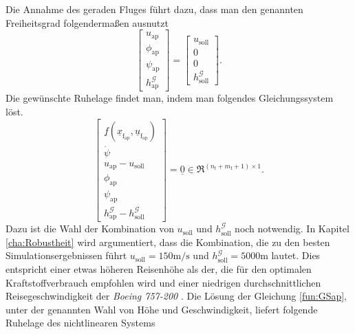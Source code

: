 Die Annahme des geraden Fluges führt dazu, dass man den genannten Freiheitsgrad folgenderma{\ss}en ausnutzt
\begin{equation}
\begin{bmatrix} 
u_\mathrm{ap} \\
\phi_\mathrm{ap} \\
\psi_\mathrm{ap}\\
h^\mathcal{G}_\mathrm{ap}
\end{bmatrix} = \begin{bmatrix} 
u_\mathrm{soll} \\
0 \\
0\\
h^\mathcal{G}_\mathrm{soll}
\end{bmatrix}.
\end{equation} 
Die gewünschte Ruhelage findet man, indem man folgendes Gleichungssystem löst.
\begin{equation}
\label{fun:GSap}
\begin{bmatrix} 
\underline{f}(\underline{x}_\mathrm{f_{ap}},\underline{u}_\mathrm{f_{ap}}) \\
\dot{\psi} \\
u_\mathrm{ap} - u_\mathrm{soll}\\
\phi_\mathrm{ap}\\
\psi_\mathrm{ap}\\
h^\mathcal{G}_\mathrm{ap} -h^\mathcal{G}_\mathrm{soll}
\end{bmatrix} = \underline{0} \in \Re^{(n_\mathrm{f}+m_\mathrm{f}+1)\times 1}.
\end{equation}
Dazu ist die Wahl der Kombination von $u_\mathrm{soll}$ und $h^\mathcal{G}_\mathrm{soll}$ noch notwendig. In Kapitel \ref{cha:Robustheit} wird argumentiert, dass die Kombination, die zu den besten Simulationsergebnissen führt $u_\mathrm{soll} = 150 \mathrm{m/s}$ und  $h^\mathcal{G}_\mathrm{soll} = 5000 \mathrm{m}$ lautet. Dies entspricht einer etwas höheren Reisenhöhe als der, die für den optimalen Kraftstoffverbrauch \cite{OptimalHeight} empfohlen wird und einer niedrigen durchschnittlichen Reisegeschwindigkeit der \textit{Boeing 757-200} \cite{B7572}. Die Lösung der Gleichung \ref{fun:GSap}, unter der genannten Wahl von Höhe und Geschwindigkeit, liefert folgende Ruhelage des nichtlinearen Systems \\
